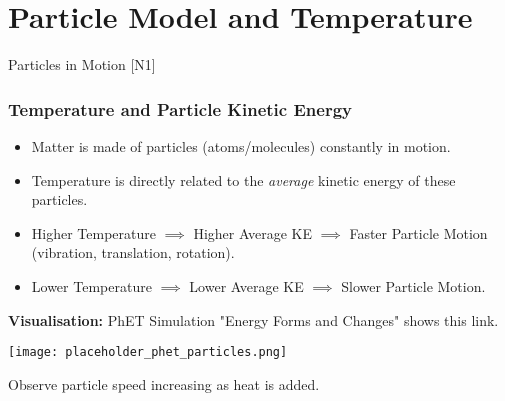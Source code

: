 \documentclass[xcolor=svgnames]{beamer}
\begin{document}
\section{Particle Model and Temperature}
\begin{frame}{Particles in Motion [N1]}
    \frametitle{Temperature and Particle Kinetic Energy}
    \begin{itemize}
        \item Matter is made of particles (atoms/molecules) constantly in motion.
        \item Temperature is directly related to the \textit{average} kinetic energy of these particles.
        \item Higher Temperature $\implies$ Higher Average KE $\implies$ Faster Particle Motion (vibration, translation, rotation).
        \item Lower Temperature $\implies$ Lower Average KE $\implies$ Slower Particle Motion.
    \end{itemize}
    \vspace{1em}
    \textbf{Visualisation:} PhET Simulation "Energy Forms and Changes" shows this link.
    \begin{center}
    \texttt{[image: placeholder\_phet\_particles.png]} %
    \end{center}
    Observe particle speed increasing as heat is added.
\end{frame}
\end{document}
